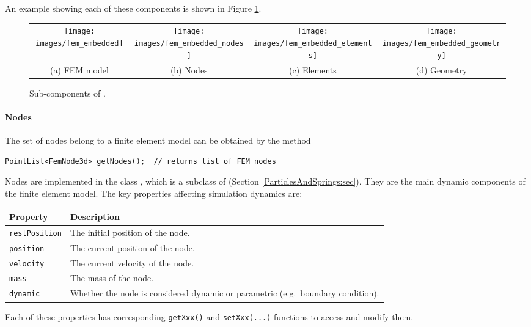 An example showing each of these components is shown in Figure \ref{fig:fem}.

\begin{figure}[ht]
	\centering
	\begin{tabular}{cccc}
	\texttt{[image: images/fem\_embedded]} & 
	\texttt{[image: images/fem\_embedded\_nodes]} &
	\texttt{[image: images/fem\_embedded\_elements]} &
	\texttt{[image: images/fem\_embedded\_geometry]}\\
	(a) FEM model & (b) Nodes & (c) Elements & (d) Geometry
	\end{tabular}
	\caption{Sub-components of . \label{fig:fem}}
\end{figure}

\paragraph{Nodes}
\ifLaTeXML{\newline}

The set of nodes belong to a finite element model can be obtained by the method
\begin{lstlisting}[]
PointList<FemNode3d> getNodes();  // returns list of FEM nodes
\end{lstlisting}
Nodes are implemented in the class 
, which is a subclass of 
 (Section 
\ref{ParticlesAndSprings:sec}).  They are the main dynamic components of
the finite element model.  The key properties affecting simulation dynamics
are:
\begin{center}
	\begin{tabular}{|ll|}
		\hline
		Property & Description\\
		\hline
		{\tt restPosition} & The initial position of the node.\\
		{\tt position} & The current position of the node.\\
		{\tt velocity} & The current velocity of the node.\\
		{\tt mass} & The mass of the node.\\
		{\tt dynamic} & Whether the node is considered dynamic or parametric 
		                (e.g.~boundary condition).\\
		\hline
	\end{tabular}
\end{center}
Each of these properties has corresponding {\tt getXxx()} and 
{\tt setXxx(...)} functions to access and modify them.


